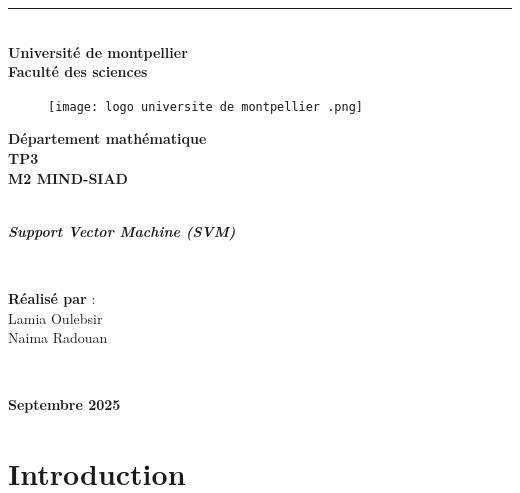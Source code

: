 \documentclass[12pt,a4paper]{report}
\begin{document}
\begin{center}
\thispagestyle{empty}
\rule{1\textwidth}{0,5pt}\vspace{0,5cm}\\
\textbf{Université de montpellier\\
Faculté des sciences}\\
\vspace{1cm}
\begin{figure}[H]
    \centering
    \texttt{[image: logo universite de montpellier .png]}
 
   
\end{figure}

\end{center}

\begin{center}
\textbf{Département mathématique}
\vspace{1cm}
\hspace{2cm}\\
\textbf{\huge{TP3 }} \\
\vspace{1cm}
\textbf{M2 MIND-SIAD}
\vspace{1cm}

\rule{0,9\textwidth}{3pt}\\
\vspace{0,3cm}
\large\textit{\textbf{ Support Vector Machine (SVM)}}
\normalsize
\rule{0,9\textwidth}{3pt}\\ 
 
\end{center}
\vspace{1cm}
\hspace{0,2cm}
\begin{center}
\textbf{Réalisé par} :\\ Lamia Oulebsir\\Naima Radouan
\end{center}
\\
\vspace{1cm}
\begin{center}
\textbf{Septembre 2025 }
\end{center}
\pagestyle{plain}




\tableofcontents

\section{Introduction}
\end{document}
